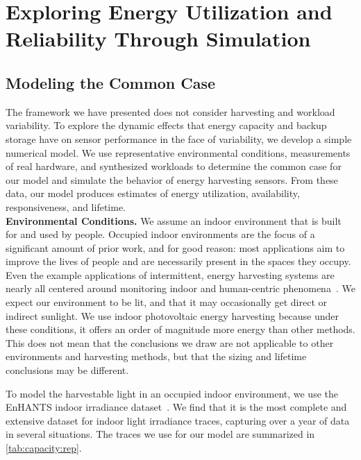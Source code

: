 \chapter{Exploring Energy Utilization and Reliability Through Simulation}
\label{cha:capacity}

\section{Modeling the Common Case}
\label{sec:overview}
The framework we have presented does not consider
harvesting and workload
variability.
To explore the dynamic effects that energy
capacity and backup storage have on sensor performance in the face
of variability, we develop a simple numerical model.
We use representative environmental conditions, measurements of real hardware,
and synthesized workloads to determine the common case for our model and simulate
the behavior of energy harvesting sensors. From these data, our model
produces estimates of energy utilization, availability, responsiveness, and
lifetime.
\\

\vspace{-6pt}
\noindent
\textbf{Environmental Conditions.}
We assume an indoor environment
that is built for and used
by people.
Occupied indoor environments are the focus of a significant
amount of
prior work, 
and for good reason: most
applications aim to improve the lives of people and are necessarily present
in the spaces they occupy. Even the example applications of intermittent,
energy harvesting systems are nearly all centered around monitoring
indoor and human-centric phenomena~\cite{hesterTimely17,hesterFlicker17,colinReconfigurable18,campbellEnergy14}.
We expect our environment to be lit, and that it may
occasionally get direct or indirect sunlight. We use
indoor photovoltaic energy harvesting because under these conditions,
it offers an order of magnitude more energy than other methods.
This does not mean that the conclusions we draw are not applicable to other
environments and harvesting methods, but that the sizing and lifetime
conclusions may be different.

To model the harvestable light in an occupied indoor environment, we use
the EnHANTS indoor irradiance dataset~\cite{gorlatova2013networking}. We
find that it is the most complete and extensive dataset for indoor light
irradiance traces, capturing over a year of data in several situations.
The traces we use for our model are summarized in \cref{tab:capacity:rep}.\\

